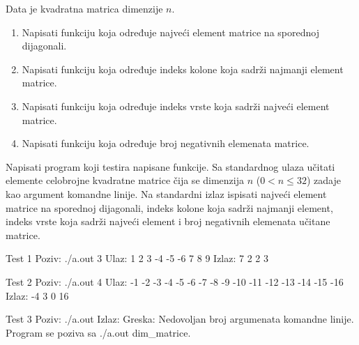 \begin{Exercise}[label=323]
Data je kvadratna matrica dimenzije $n$.
\begin{enumerate}
\item Napisati funkciju koja određuje najveći element matrice na sporednoj dijagonali.
\item Napisati funkciju koja određuje indeks kolone koja sadrži najmanji element matrice.
\item Napisati funkciju koja određuje indeks vrste koja sadrži najveći element matrice.
\item Napisati funkciju koja određuje broj negativnih elemenata matrice.
\end{enumerate}
Napisati program koji testira napisane funkcije. Sa standardnog
ulaza učitati elemente celobrojne kvadratne matrice čija
se dimenzija $n$ ($0 < n \leq 32$) zadaje kao argument
komandne linije. Na standardni izlaz ispisati najveći element matrice na sporednoj dijagonali,
indeks kolone koja sadrži najmanji element, indeks vrste koja sadrži najveći element i broj 
negativnih elemenata učitane matrice. 


\begin{miditest}
\begin{test}{Test 1}
Poziv:  ./a.out 3
Ulaz:   1 2 3
        -4 -5 -6
        7 8 9
Izlaz:  7 2 2 3
\end{test}
\end{miditest}
\begin{miditest}
\begin{test}{Test 2}
Poziv:  ./a.out 4
Ulaz:   -1 -2 -3 -4
        -5 -6 -7 -8
        -9 -10 -11 -12
        -13 -14 -15 -16
Izlaz:  -4 3 0 16
\end{test}
\end{miditest}

\begin{maxitest}
\begin{test}{Test 3}
Poziv: ./a.out 
Izlaz: Greska: Nedovoljan broj argumenata komandne linije.
       Program se poziva sa ./a.out dim_matrice.
\end{test}
\end{maxitest}
\end{Exercise}
\begin{Answer}[ref=323]
\end{Answer}

